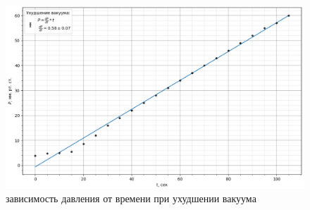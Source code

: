 \documentclass[a4paper, 12pt]{article}%
\begin{document}
\begin{figure}[H]
	\centering
	\includegraphics[width=1\linewidth]{graph2}
	\caption[]{зависимость давления от времени при ухудшении вакуума}
	\label{fig:graph2}
\end{figure}
\end{document}
